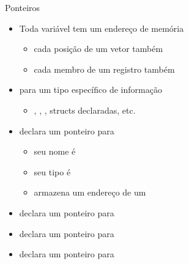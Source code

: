 \documentclass{beamer}
\begin{document}
\begin{frame}[<+->]{Ponteiros}

  \begin{itemize}
    \item Toda variável tem um \alert{endereço de memória}
      \begin{itemize}
        \item cada posição de um vetor também
        \item cada membro de um registro também
      \end{itemize}
  \end{itemize}

  \bigskip
  \begin{itemize}
    \item para um tipo específico de informação
      \begin{itemize}
        \item {}, , , structs declaradas, etc.
      \end{itemize}
  \end{itemize}

  \bigskip
  \begin{itemize}
    \item {} declara um ponteiro para \alert{}
      \begin{itemize}
        \item seu nome é 
        \item seu tipo é 
        \item armazena um endereço de um 
      \end{itemize}
    \item {} declara um ponteiro para 
    \item {} declara um ponteiro para 
    \item {} declara um ponteiro para 
  \end{itemize}
\end{frame}
\end{document}
